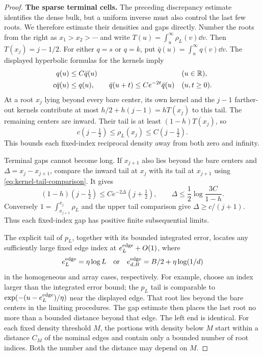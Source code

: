 \begin{proof}
\smallskip\noindent\textbf{The sparse terminal cells.}
The preceding discrepancy estimate identifies the dense bulk, but a
uniform inverse must also control the last few roots. We therefore
estimate their densities and gaps directly.  Number the roots from the right as
$x_1>x_2>\cdots$ and write
$T(u)=\int_u^\infty\rho_L(v)\dd v$.  Then
$T(x_j)=j-1/2$.  For either $q=s$ or $q=k$, put
$\bar q(u)=\int_u^\infty q(v)\dd v$.
The displayed hyperbolic formulas for the kernels imply
\begin{align}
 q(u)&\le C\bar q(u) &&(u\in\mathbb R),\notag\\
 c\bar q(u)&\le q(u),\qquad
 \bar q(u+t)\le C e^{-2t}\bar q(u)
 &&(u,t\ge0).
 \label{eq:kernel-tail-comparison}
\end{align}
At a root $x_j$ lying beyond every bare center, its own kernel and
the $j-1$ farther-out kernels contribute at most
$h/2+h(j-1)=hT(x_j)$ to this tail.  The remaining centers are
inward.  Their tail is at least $(1-h)T(x_j)$, so
\begin{equation}\label{eq:edge-index-density}
 c(j-\tfrac12)\le\rho_L(x_j)\le C(j-\tfrac12).
\end{equation}
This bounds each fixed-index reciprocal density away from both
zero and infinity.

Terminal gaps cannot become long.  If $x_{j+1}$ also lies beyond
the bare centers and $\Delta=x_j-x_{j+1}$, compare the inward
tail at $x_j$ with its tail at $x_{j+1}$ using
\eqref{eq:kernel-tail-comparison}.  It gives
\[
 (1-h)(j-\tfrac12)
 \le C e^{-2\Delta}(j+\tfrac12),
 \qquad
 \Delta\le\frac12\log\frac{3C}{1-h}.
\]
Conversely $1=\int_{x_{j+1}}^{x_j}\rho_L$ and the upper tail
comparison give $\Delta\ge c/(j+1)$.
Thus each fixed-index gap has positive finite subsequential limits.

The explicit tail of $p_L$, together with its bounded integrated
error, locates any sufficiently large fixed edge index at
$e_L^{\rm edge}+O(1)$, where
\begin{equation}\label{eq:nominal-edges}
 e_L^{\rm edge}=\eta\log L
 \quad\hbox{or}\quad
 e_{d,B}^{\rm edge}=B/2+\eta\log(1/d)
\end{equation}
in the homogeneous and array cases, respectively.  For example,
choose an index larger than the integrated error bound; the
$p_L$ tail is comparable to
$\exp(-(u-e_L^{\rm edge})/\eta)$ near the displayed edge.
That root lies beyond the bare centers in the limiting procedures.
The gap estimate then places the last root no more than a bounded
distance beyond that edge.  The left end is identical.
For each fixed density threshold $M$, the portions with density
below $M$ start within a distance $C_M$ of the nominal edges and
contain only a bounded number of root indices.  Both the number and
the distance may depend on $M$.


\end{proof}
